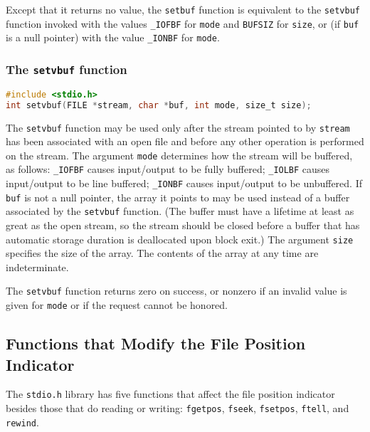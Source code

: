 Except that it returns no value, the \texttt{setbuf} function is equivalent to
the \texttt{setvbuf} function invoked with the values \texttt{\_IOFBF} for
\texttt{mode} and \texttt{BUFSIZ} for \texttt{size}, or (if \texttt{buf} is a
null pointer) with the value \texttt{\_IONBF} for \texttt{mode}.

\subsubsection{The \texttt{setvbuf} function}
\lstset{basicstyle=\scriptsize, numbers=left, captionpos=b, tabsize=4}
\begin{lstlisting}[caption=Section \thesection listing \arabic{filecnt},language={C},
breaklines=true,xleftmargin=15pt,label=lst:section\thesection listing\arabic{filecnt}]
#include <stdio.h>
int setvbuf(FILE *stream, char *buf, int mode, size_t size);
\end{lstlisting}

The \texttt{setvbuf} function may be used only after the stream pointed to by
\texttt{stream} has been associated with an open file and before any other
operation is performed on the stream. The argument \texttt{mode} determines how
the stream will be buffered, as follows: \texttt{\_IOFBF} causes input/output
to be fully buffered; \texttt{\_IOLBF} causes input/output to be line buffered;
\texttt{\_IONBF} causes input/output to be unbuffered. If \texttt{buf} is not a
null pointer, the array it points to may be used instead of a buffer associated
by the \texttt{setvbuf} function. (The buffer must have a lifetime at least as
great as the open stream, so the stream should be closed before a buffer that
has automatic storage duration is deallocated upon block exit.) The argument
\texttt{size} specifies the size of the array. The contents of the array at any
time are indeterminate.

The \texttt{setvbuf} function returns zero on success, or nonzero if an invalid
value is given for \texttt{mode} or if the request cannot be honored.

\subsection{Functions that Modify the File Position Indicator}
The \texttt{stdio.h} library has five functions that affect the file position
indicator besides those that do reading or writing: \texttt{fgetpos},
\texttt{fseek}, \texttt{fsetpos}, \texttt{ftell}, and \texttt{rewind}.

